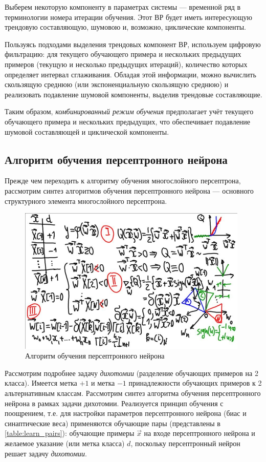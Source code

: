 \documentclass{article}
\numberwithin{equation}{subsection}
\begin{document}
Выберем некоторую компоненту в параметрах системы --- временной ряд в терминологии
номера итерации обучения. Этот ВР будет иметь интересующую трендовую составляющую,
шумовою и, возможно, циклические компоненты.

Пользуясь подходами выделения трендовых компонент ВР, используем цифровую фильтрацию:
для текущего обучающего примера и нескольких предыдущих примеров (текущую и несколько
предыдущих итераций), количество которых определяет интервал сглаживания.
Обладая этой информации, можно вычислить скользящую среднюю (или экспоненциальную 
скользящую среднюю) и реализовать подавление шумовой компоненты, выделив 
трендовые составляющие.

Таким образом, \textit{комбинированный режим обучения} предполагает учёт текущего
обучающего примера и нескольких предыдущих, что обеспечивает подавление шумовой 
составляющей и циклической компоненты.




\subsection{Алгоритм обучения персептронного нейрона}

Прежде чем переходить к алгоритму обучения многослойного персептрона, рассмотрим
синтез алгоритмов обучения персептронного нейрона --- основного структурного
элемента многослойного персептрона.

\begin{figure}[htbp]
    \centering
    \includegraphics[height=7cm]{hyperflat_6_1.jpeg}
    \caption{Алгоритм обучения персептронного нейрона}
    \label{hyperflat_6_1}
\end{figure}

Рассмотрим подробнее задачу \textit{дихотомии} (разделение обучающих примеров 
на 2 класса). Имеется метка $+1$ и метка $-1$ принадлежности обучающих примеров 
к 2 альтернативным классам. Рассмотрим синтез алгоритма обучения персептронного 
нейрона в рамках задачи дихотомии. Реализуется принцип обучения с поощрением, т.е.
для настройки параметров персептронного нейрона (биас и синаптические веса) 
применяются обучающие пары (представлены в \ref{table:learn_pairs}): обучающие примеры
$\vec{x}$ на входе персептронного нейрона и желаемое указание (или метка класса) $d$,
поскольку персептронный нейрон решает задачу \textit{дихотомии}.
\end{document}
